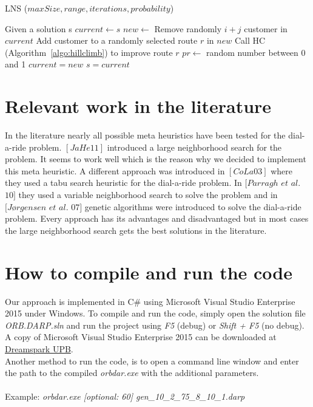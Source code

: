 \documentclass[fleqn]{scrartcl}
\begin{document}
\begin{algorithm}
\caption{LNS ($maxSize, range, iterations, probability$)}
\label{algo:lns}
\begin{algorithmic}[1]
\State Given a solution s
\State $current \gets s$
\State $new \gets$ Remove randomly $i+j$ customer in $current$
\State Add customer to a randomly selected route $r$ in $new$
\State Call HC (Algorithm~\ref{algo:hillclimb}) to improve route $r$
\EndFor
\State $pr \gets$ random number between 0 and 1
\State $current = new$
\State $s = current$
\EndIf
\EndIf
\EndIf
\EndFor
\EndFor
\EndFor
\end{algorithmic}
\end{algorithm}

\newpage
\section{Relevant work in the literature}
In the literature nearly all possible meta heuristics have been tested for the dial-a-ride problem. 
$[JaHe 11]$ introduced a large neighborhood search for the problem. It seems to work well which is the reason why we decided to implement this meta heuristic. A different approach was introduced in $[CoLa 03]$ where they used a tabu search heuristic for the dial-a-ride problem. In $[Parragh$  $et$  $al.$ $10]$ they used a variable neighborhood search to solve the problem and in $[Jørgensen$ $et$ $al.$ $07]$ genetic algorithms were introduced to solve the dial-a-ride problem.
Every approach has its advantages and disadvantaged but in most cases the large neighborhood search gets the best solutions in the literature.

\section{How to compile and run the code}
Our approach is implemented in C\# using Microsoft Visual Studio Enterprise 2015 under Windows. To compile and run the code, simply open the solution file \textit{ORB.DARP.sln} and run the project using \textit{F5} (debug) or \textit{Shift + F5} (no debug). A copy of Microsoft Visual Studio Enterprise 2015 can be downloaded at \href{https://dreamspark.uni-paderborn.de/}{Dreamspark UPB}.
\\
Another method to run the code, is to open a command line window and enter the path to the compiled \textit{orbdar.exe} with the additional parameters.
\\\\
Example: \textit{orbdar.exe [optional: 60]  gen\_10\_2\_75\_8\_10\_1.darp}
\end{document}
